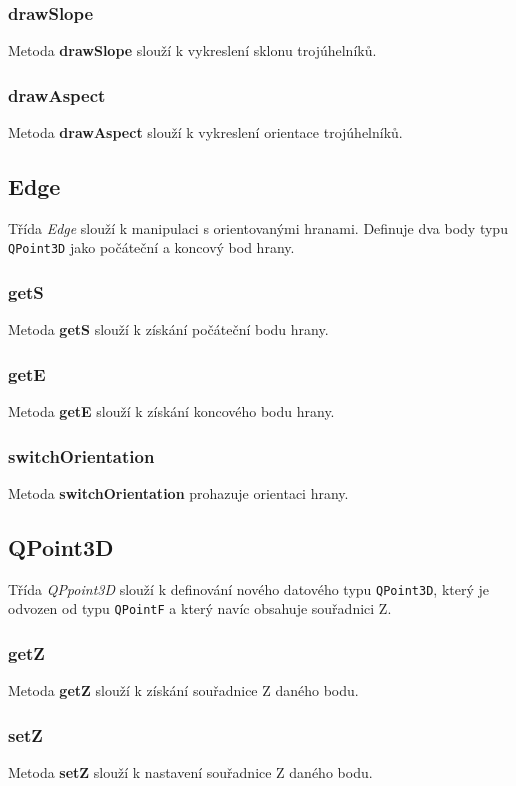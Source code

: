 \documentclass[a4paper, 12pt]{article}
\begin{document}
\subsubsection*{drawSlope}
Metoda \textbf{drawSlope} slouží k vykreslení sklonu trojúhelníků.

\subsubsection*{drawAspect}
Metoda \textbf{drawAspect} slouží k vykreslení orientace trojúhelníků.


\subsection{Edge}
Třída \textit{Edge} slouží k manipulaci s orientovanými hranami. Definuje dva body typu \texttt{QPoint3D} jako počáteční a koncový bod hrany.

\subsubsection*{getS}
Metoda \textbf{getS} slouží k získání počáteční bodu hrany. 

\subsubsection*{getE}
Metoda \textbf{getE} slouží k získání koncového bodu hrany. 

\subsubsection*{switchOrientation}
Metoda \textbf{switchOrientation} prohazuje orientaci hrany.  


\subsection{QPoint3D}
Třída \textit{QPpoint3D} slouží k definování nového datového typu \texttt{QPoint3D}, který je odvozen od typu \texttt{QPointF} a který navíc obsahuje souřadnici Z.

\subsubsection*{getZ}
Metoda \textbf{getZ} slouží k získání souřadnice Z daného bodu.

\subsubsection*{setZ}
Metoda \textbf{setZ} slouží k nastavení souřadnice Z daného bodu. 
\end{document}
